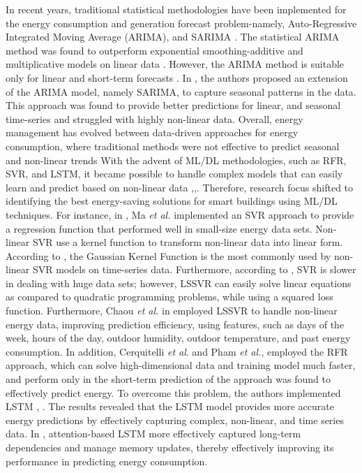 \documentclass[journal]{IEEEtran}
\begin{document}
In recent years, traditional statistical methodologies have been implemented for the energy consumption and generation forecast problem-namely, Auto-Regressive Integrated Moving Average (ARIMA), and SARIMA \cite{Ref23}\cite{Ref8}. The statistical ARIMA method was found to outperform exponential smoothing-additive and multiplicative models on linear data \cite{Ref7}. However, the ARIMA method is suitable only for linear and short-term forecasts \cite{Ref20}. In \cite{ref16}, the authors proposed an extension of the ARIMA model, namely SARIMA, to capture seasonal patterns in the data. This approach was found to provide better predictions for linear, and seasonal time-series and struggled with highly non-linear data. Overall, energy management has evolved between data-driven approaches for energy consumption, where traditional methods were not effective to predict seasonal and non-linear trends \cite{Industrial2025}
With the advent of ML/DL methodologies, such as RFR, SVR, and LSTM, it became possible to handle complex models that can easily learn and predict based on non-linear data \cite{Ref},\cite{Ref2},\cite{Ref21}. Therefore, research focus shifted to identifying the best energy-saving solutions for smart buildings using ML/DL techniques. For instance, in \cite{Ref9}, Ma \textit{et al.} implemented an SVR approach to provide a regression function that performed well in small-size energy data sets. Non-linear SVR use a kernel function to transform non-linear data into linear form\cite{Ref9}. According to \cite{Ref5}, the Gaussian Kernel Function is the most commonly used by non-linear SVR models on time-series data. Furthermore, according to \cite{Ref}, SVR is slower in dealing with huge data sets; however, LSSVR can easily solve linear equations as compared to quadratic programming problems, while using a squared loss function. Furthermore, Chaou \textit{et al.} in \cite{Ref17} employed LSSVR to handle non-linear energy data, improving prediction efficiency, using features, such as days of the week, hours of the day, outdoor humidity, outdoor temperature, and past energy consumption. In addition, Cerquitelli \textit{et al}.\cite{Ref15} and Pham \textit{et al.}, \cite{Ref24} employed the RFR approach, which can solve high-dimensional data and training model much faster, and perform only in the short-term prediction of the approach was found to effectively predict energy. To overcome this problem, the authors implemented LSTM \cite{LSTM2023}, \cite{Ref14}. The results revealed that the LSTM model provides more accurate energy predictions by effectively capturing complex, non-linear, and time series data. In \cite{Hybrid2025}, attention-based LSTM more effectively captured long-term dependencies and manage memory updates, thereby effectively improving its performance in predicting energy consumption.
\end{document}
